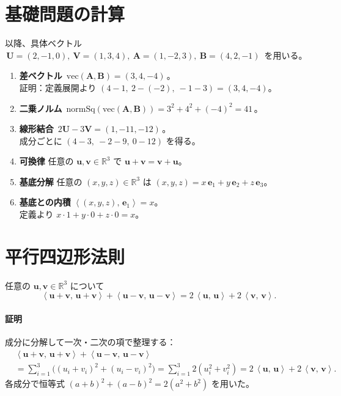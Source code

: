 \documentclass[luatexja,ja=standard,a4paper,12pt]{bxjsarticle}
\newcommand{\R}{\mathbb{R}}
\newcommand{\ip}[2]{\left\langle #1,\,#2 \right\rangle}
\newcommand{\vv}[1]{\bm{#1}}
\begin{document}
\section{基礎問題の計算}
以降、具体ベクトル
\(\,\vv U=(2,-1,0),\ \vv V=(1,3,4),\ \vv A=(1,-2,3),\ \vv B=(4,2,-1)\,\) を用いる。

\begin{enumerate}[label=\textbf{Q\arabic*:},leftmargin=*]
 \item \textbf{差ベクトル} \(\,\mathrm{vec}(\vv A,\vv B)=(3,4,-4)\,\)。\\
 証明：定義展開より \((4-1,\ 2-(-2),\ -1-3)=(3,4,-4)\)。

 \item \textbf{二乗ノルム} \(\,\mathrm{normSq}(\mathrm{vec}(\vv A,\vv B))=3^2+4^2+(-4)^2=41\,\)。

 \item \textbf{線形結合} \(\,2\vv U-3\vv V=(1,-11,-12)\,\)。\\
 成分ごとに \((4-3,\ -2-9,\ 0-12)\) を得る。

 \item \textbf{可換律} 任意の \(\vv u,\vv v\in\R^3\) で \(\vv u+\vv v=\vv v+\vv u\)。

 \item \textbf{基底分解} 任意の \((x,y,z)\in\R^3\) は
 \((x,y,z)=x\,\vv e_1+y\,\vv e_2+z\,\vv e_3\)。

 \item \textbf{基底との内積} \(\ip{(x,y,z)}{\vv e_1}=x\)。\\
 定義より \(x\cdot1+y\cdot0+z\cdot0=x\)。
\end{enumerate}

\section{平行四辺形法則}
任意の \(\vv u,\vv v\in\R^3\) について
\begin{equation}\label{eq:parallelogram}
 \ip{\vv u+\vv v}{\vv u+\vv v}+\ip{\vv u-\vv v}{\vv u-\vv v}
 = 2\,\ip{\vv u}{\vv u}+2\,\ip{\vv v}{\vv v}.
\end{equation}
\paragraph{証明} 成分に分解して一次・二次の項で整理する：
\begin{align*}
 &\ip{\vv u+\vv v}{\vv u+\vv v}+\ip{\vv u-\vv v}{\vv u-\vv v}\\
 &=\sum_{i=1}^3\bigl((u_i+v_i)^2+(u_i-v_i)^2\bigr)
 =\sum_{i=1}^3 2(u_i^2+v_i^2)
 =2\,\ip{\vv u}{\vv u}+2\,\ip{\vv v}{\vv v}.
\end{align*}
各成分で恒等式 \((a+b)^2+(a-b)^2=2(a^2+b^2)\) を用いた。
\end{document}
